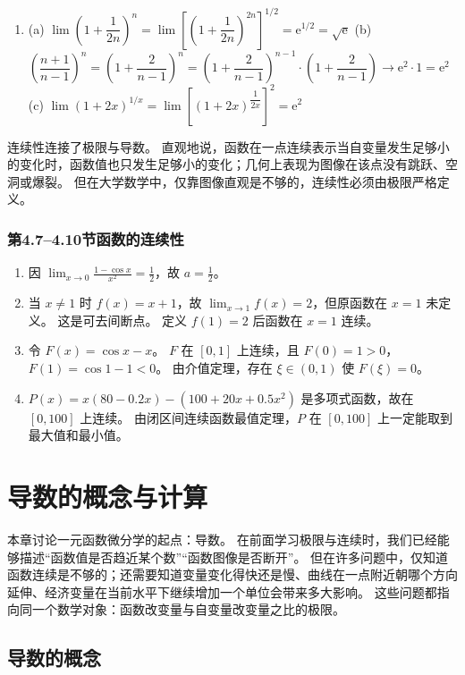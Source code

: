 \documentclass[fontset=fandol]{ctexart}
\newcommand{\ee}{\mathrm{e}}
\begin{document}
\begin{enumerate}
\item[10.] 
(a) \(\lim\left(1+\dfrac{1}{2n}\right)^n = \lim\left[\left(1+\dfrac{1}{2n}\right)^{2n}\right]^{1/2} = \ee^{1/2} = \sqrt{\ee}\) \quad
   (b) \(\left(\dfrac{n+1}{n-1}\right)^n = \left(1 + \dfrac{2}{n-1}\right)^n = \left(1 + \dfrac{2}{n-1}\right)^{n-1} \cdot \left(1 + \dfrac{2}{n-1}\right) \to \ee^2 \cdot 1 = \ee^2\) \quad
   (c) \(\lim (1+2x)^{1/x} = \lim \left[(1+2x)^{\dfrac{1}{2x}}\right]^2 = \ee^2\)
\end{enumerate}

连续性连接了极限与导数。 直观地说，函数在一点连续表示当自变量发生足够小的变化时，函数值也只发生足够小的变化；几何上表现为图像在该点没有跳跃、空洞或爆裂。 但在大学数学中，仅靠图像直观是不够的，连续性必须由极限严格定义。

\subsubsection*{第4.7--4.10节\quad 函数的连续性}

\begin{enumerate}[label=\textbf{练习\arabic*.},leftmargin=2.2em]
\item 因 $\lim_{x\to0}\frac{1-\cos x}{x^2}=\frac12$，故 $a=\frac12$。
\item 当 $x\neq1$ 时 $f(x)=x+1$，故 $\lim_{x\to1}f(x)=2$，但原函数在 $x=1$ 未定义。 这是可去间断点。 定义 $f(1)=2$ 后函数在 $x=1$ 连续。
\item 令 $F(x)=\cos x-x$。 $F$ 在 $[0,1]$ 上连续，且 $F(0)=1>0$，$F(1)=\cos1-1<0$。 由介值定理，存在 $\xi\in(0,1)$ 使 $F(\xi)=0$。
\item $P(x)=x(80-0.2x)-(100+20x+0.5x^2)$ 是多项式函数，故在 $[0,100]$ 上连续。 由闭区间连续函数最值定理，$P$ 在 $[0,100]$ 上一定能取到最大值和最小值。
\end{enumerate}

\fi

\clearpage
\section{导数的概念与计算}

本章讨论一元函数微分学的起点：导数。 在前面学习极限与连续时，我们已经能够描述“函数值是否趋近某个数”“函数图像是否断开”。 但在许多问题中，仅知道函数连续是不够的；还需要知道变量变化得快还是慢、曲线在一点附近朝哪个方向延伸、经济变量在当前水平下继续增加一个单位会带来多大影响。 这些问题都指向同一个数学对象：函数改变量与自变量改变量之比的极限。


\subsection{导数的概念}
\end{document}
